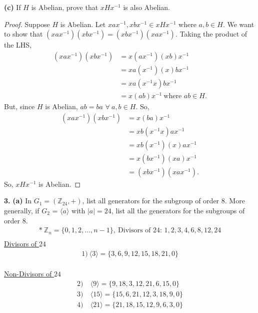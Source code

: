 \documentclass[12pt, letterpaper]{article}
\begin{document}
\indent \textbf{(c)} If $H$ is Abelian, prove that $xHx^{-1}$ is also Abelian.
\begin{proof}
    Suppose $H$ is Abelian. Let $xax^{-1}, xbx^{-1} \in xHx^{-1}$ where $a,b \in H$. We want to show that $(xax^{-1})(xbx^{-1}) = (xbx^{-1})(xax^{-1})$. Taking the product of the LHS,
    \begin{align*}
        (xax^{-1})(xbx^{-1}) &= x(ax^{-1})(xb)x^{-1} \\
        &= xa(x^{-1})(x)bx^{-1} \\
        &= xa(x^{-1}x)bx^{-1} \\
        &= x(ab)x^{-1} \ \text{where $ab \in H$}.
    \end{align*}
    But, since $H$ is Abelian, $ab = ba$ $\forall \ a,b \in H$. So,
    \begin{align*}
        (xax^{-1})(xbx^{-1}) &= x(ba)x^{-1} \\
        &= xb(x^{-1}x)ax^{-1} \\
        &= xb(x^{-1})(x)ax^{-1} \\
        &= x(bx^{-1})(xa)x^{-1} \\
        &= (xbx^{-1})(xax^{-1}).
    \end{align*}
    So, $xHx^{-1}$ is Abelian.
\end{proof}  
\hspace{0.2em}
\textbf{3.}
\textbf{(a)} In $G_{1} = (\mathbb{Z}_{24}, +)$, list all generators for the subgroup of order $8$. More generally, if $G_{2}$ = $\langle{a}\rangle$ with $|a| = 24$, list all the generators for the subgroups of order $8$.
\begin{align*}
    * \ \mathbb{Z}_{n} = \{0, 1, 2, \dots, n-1\}, \ \text{Divisors of $24$: $1, 2, 3, 4, 6, 8, 12, 24$}\\ 
\end{align*}
\underline{Divisors of $24$}
\begin{align*}
    1) \ \boxed{\langle{3}\rangle = \{3, 6, 9, 12, 15, 18, 21, 0\} }
\end{align*} \\
\underline{Non-Divisors of $24$}
\begin{align*}
    2) \ &\boxed{\langle{9}\rangle = \{9, 18, 3, 12, 21, 6, 15, 0\} } \\
    3) \ &\boxed{\langle{15}\rangle = \{15, 6, 21, 12, 3, 18, 9, 0\} } \\ 
    4) \ &\boxed{\langle{21}\rangle = \{21, 18, 15, 12, 9, 6, 3, 0\} }
\end{align*} \\
\end{document}
